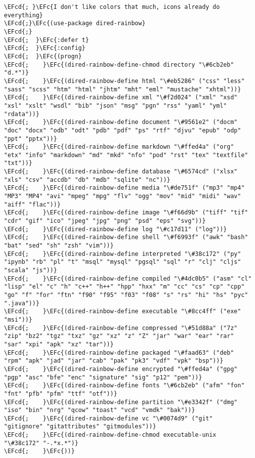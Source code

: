 \documentclass[a4wide,10pt]{article}
\newcommand{\EFc}[1]{\textcolor{EFc}{#1}} %
\newcommand{\EFcd}[1]{\textcolor{EFcd}{#1}} %
\begin{document}
\begin{Code}
\begin{Verbatim}
\EFcd{; }\EFc{I don't like colors that much, icons already do everything}
\EFcd{;}\EFc{(use-package dired-rainbow}
\EFcd{;}
\EFcd{;  }\EFc{:defer t}
\EFcd{;  }\EFc{:config}
\EFcd{;  }\EFc{(progn}
\EFcd{;    }\EFc{(dired-rainbow-define-chmod directory "\#6cb2eb" "d.*")}
\EFcd{;    }\EFc{(dired-rainbow-define html "\#eb5286" ("css" "less" "sass" "scss" "htm" "html" "jhtm" "mht" "eml" "mustache" "xhtml"))}
\EFcd{;    }\EFc{(dired-rainbow-define xml "\#f2d024" ("xml" "xsd" "xsl" "xslt" "wsdl" "bib" "json" "msg" "pgn" "rss" "yaml" "yml" "rdata"))}
\EFcd{;    }\EFc{(dired-rainbow-define document "\#9561e2" ("docm" "doc" "docx" "odb" "odt" "pdb" "pdf" "ps" "rtf" "djvu" "epub" "odp" "ppt" "pptx"))}
\EFcd{;    }\EFc{(dired-rainbow-define markdown "\#ffed4a" ("org" "etx" "info" "markdown" "md" "mkd" "nfo" "pod" "rst" "tex" "textfile" "txt"))}
\EFcd{;    }\EFc{(dired-rainbow-define database "\#6574cd" ("xlsx" "xls" "csv" "accdb" "db" "mdb" "sqlite" "nc"))}
\EFcd{;    }\EFc{(dired-rainbow-define media "\#de751f" ("mp3" "mp4" "MP3" "MP4" "avi" "mpeg" "mpg" "flv" "ogg" "mov" "mid" "midi" "wav" "aiff" "flac"))}
\EFcd{;    }\EFc{(dired-rainbow-define image "\#f66d9b" ("tiff" "tif" "cdr" "gif" "ico" "jpeg" "jpg" "png" "psd" "eps" "svg"))}
\EFcd{;    }\EFc{(dired-rainbow-define log "\#c17d11" ("log"))}
\EFcd{;    }\EFc{(dired-rainbow-define shell "\#f6993f" ("awk" "bash" "bat" "sed" "sh" "zsh" "vim"))}
\EFcd{;    }\EFc{(dired-rainbow-define interpreted "\#38c172" ("py" "ipynb" "rb" "pl" "t" "msql" "mysql" "pgsql" "sql" "r" "clj" "cljs" "scala" "js"))}
\EFcd{;    }\EFc{(dired-rainbow-define compiled "\#4dc0b5" ("asm" "cl" "lisp" "el" "c" "h" "c++" "h++" "hpp" "hxx" "m" "cc" "cs" "cp" "cpp" "go" "f" "for" "ftn" "f90" "f95" "f03" "f08" "s" "rs" "hi" "hs" "pyc" ".java"))}
\EFcd{;    }\EFc{(dired-rainbow-define executable "\#8cc4ff" ("exe" "msi"))}
\EFcd{;    }\EFc{(dired-rainbow-define compressed "\#51d88a" ("7z" "zip" "bz2" "tgz" "txz" "gz" "xz" "z" "Z" "jar" "war" "ear" "rar" "sar" "xpi" "apk" "xz" "tar"))}
\EFcd{;    }\EFc{(dired-rainbow-define packaged "\#faad63" ("deb" "rpm" "apk" "jad" "jar" "cab" "pak" "pk3" "vdf" "vpk" "bsp"))}
\EFcd{;    }\EFc{(dired-rainbow-define encrypted "\#ffed4a" ("gpg" "pgp" "asc" "bfe" "enc" "signature" "sig" "p12" "pem"))}
\EFcd{;    }\EFc{(dired-rainbow-define fonts "\#6cb2eb" ("afm" "fon" "fnt" "pfb" "pfm" "ttf" "otf"))}
\EFcd{;    }\EFc{(dired-rainbow-define partition "\#e3342f" ("dmg" "iso" "bin" "nrg" "qcow" "toast" "vcd" "vmdk" "bak"))}
\EFcd{;    }\EFc{(dired-rainbow-define vc "\#0074d9" ("git" "gitignore" "gitattributes" "gitmodules"))}
\EFcd{;    }\EFc{(dired-rainbow-define-chmod executable-unix "\#38c172" "-.*x.*")}
\EFcd{;    }\EFc{))}


\end{Verbatim}
\end{Code}
\end{document}
